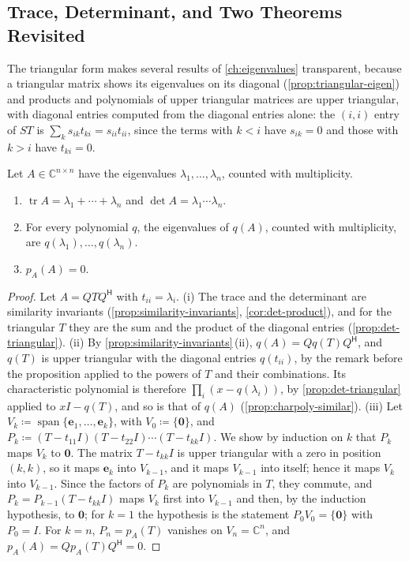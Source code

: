 \subsection{Trace, Determinant, and Two Theorems Revisited}

The triangular form makes several results of \cref{ch:eigenvalues} transparent, because a triangular matrix shows its eigenvalues on its diagonal (\cref{prop:triangular-eigen}) and products and polynomials of upper triangular matrices are upper triangular, with diagonal entries computed from the diagonal entries alone: the $(i,i)$ entry of $ST$ is $\sum_ks_{ik}t_{ki}=s_{ii}t_{ii}$, since the terms with $k<i$ have $s_{ik}=0$ and those with $k>i$ have $t_{ki}=0$.

\begin{proposition}
\label{prop:schur-consequences}
Let $A\in\mathbb C^{n\times n}$ have the eigenvalues $\lambda_1,\ldots,\lambda_n$, counted with multiplicity.
\begin{enumerate}
\item $\operatorname{tr}A=\lambda_1+\cdots+\lambda_n$ and $\det A=\lambda_1\cdots\lambda_n$.
\item For every polynomial $q$, the eigenvalues of $q(A)$, counted with multiplicity, are $q(\lambda_1),\ldots,q(\lambda_n)$.
\item $p_A(A)=0$.
\end{enumerate}
\end{proposition}

\begin{proof}
Let $A=QTQ^{\mathsf H}$ with $t_{ii}=\lambda_i$. (i) The trace and the determinant are similarity invariants (\cref{prop:similarity-invariants}, \cref{cor:det-product}), and for the triangular $T$ they are the sum and the product of the diagonal entries (\cref{prop:det-triangular}). (ii) By \cref{prop:similarity-invariants}\,(ii), $q(A)=Qq(T)Q^{\mathsf H}$, and $q(T)$ is upper triangular with the diagonal entries $q(t_{ii})$, by the remark before the proposition applied to the powers of $T$ and their combinations. Its characteristic polynomial is therefore $\prod_i(x-q(\lambda_i))$, by \cref{prop:det-triangular} applied to $xI-q(T)$, and so is that of $q(A)$ (\cref{prop:charpoly-similar}). (iii) Let $V_k\coloneqq\operatorname{span}\{\mathbf e_1,\ldots,\mathbf e_k\}$, with $V_0\coloneqq\{\mathbf 0\}$, and $P_k\coloneqq(T-t_{11}I)(T-t_{22}I)\cdots(T-t_{kk}I)$. We show by induction on $k$ that $P_k$ maps $V_k$ to $\mathbf 0$. The matrix $T-t_{kk}I$ is upper triangular with a zero in position $(k,k)$, so it maps $\mathbf e_k$ into $V_{k-1}$, and it maps $V_{k-1}$ into itself; hence it maps $V_k$ into $V_{k-1}$. Since the factors of $P_k$ are polynomials in $T$, they commute, and $P_k=P_{k-1}(T-t_{kk}I)$ maps $V_k$ first into $V_{k-1}$ and then, by the induction hypothesis, to $\mathbf 0$; for $k=1$ the hypothesis is the statement $P_0V_0=\{\mathbf 0\}$ with $P_0=I$. For $k=n$, $P_n=p_A(T)$ vanishes on $V_n=\mathbb C^n$, and $p_A(A)=Qp_A(T)Q^{\mathsf H}=0$.
\end{proof}


